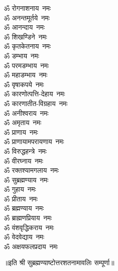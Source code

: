 \begin{multicols}{2}
\begin{flushleft}
ॐ रोगनाशनाय~नमः\\
ॐ अनन्तमूर्तये~नमः\\
ॐ आनन्दाय~नमः\\
ॐ शिखण्डिने~नमः\\
ॐ कृतकेतनाय~नमः\\
ॐ डम्भाय~नमः\\
ॐ परमडम्भाय~नमः\\
ॐ महाडम्भाय~नमः\hfill{}\\
ॐ वृषाकपये~नमः\\
ॐ कारणोत्पत्ति-देहाय~नमः\\
ॐ कारणातीत-विग्रहाय~नमः\\
ॐ अनीश्वराय~नमः\\
ॐ अमृताय~नमः\\
ॐ प्राणाय~नमः\\
ॐ प्राणायामपरायणाय~नमः\\
ॐ विरुद्धहन्त्रे~नमः\\
ॐ वीरघ्नाय~नमः\\
ॐ रक्तश्यामगलाय~नमः\hfill{}\\
ॐ सुब्रह्मण्याय~नमः\\
ॐ गुहाय~नमः\\
ॐ प्रीताय~नमः\\
ॐ ब्रह्मण्याय~नमः\\
ॐ ब्राह्मणप्रियाय~नमः\\
ॐ वंशवृद्धिकराय~नमः\\
ॐ वेदवेद्याय~नमः\\
ॐ अक्षयफलप्रदाय~नमः\\
\end{flushleft}
\end{multicols}

॥इति श्री सुब्रह्मण्याष्टोत्तरशतनामावलिः सम्पूर्णा॥